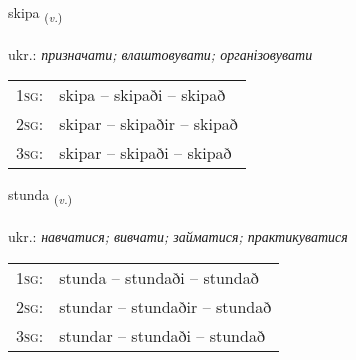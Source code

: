 \documentclass[frontgrid, backgrid]{flacards}\usepackage[]{graphicx}\usepackage[]{xcolor}
\begin{document}
\renewcommand{\flhead}{\vskip5pt \fboxsep=0pt {\small\bfseries\footnotesize Sagnorð | дієслово}}
\renewcommand{\fcfoot}{\vskip5pt \fboxsep=0pt \hspace{2pt}{\small\bfseries\footnotesize 1K}}

\renewcommand{\blhead}{\vskip5pt {\small\bfseries\footnotesize Sagnorð | дієслово }}
\renewcommand{\bcfoot}{\vskip5pt \hspace{2pt}{\small\bfseries\footnotesize 1K}}


{skipa \small{\textsubscript{(\textit{v.})}} \\[1ex] %
\textphonetic{[scɪːpa]} \\
ukr.: \emph{призначати; влаштовувати; організовувати} \\  [2ex]
\renewcommand*{\arraystretch}{0.8}
\begin{tabular}{p{1cm}l}
\textsc{1sg}: & skipa -- skipaði -- skipað \\ 
\textsc{2sg}: & skipar -- skipaðir -- skipað \\ 
\textsc{3sg}: & skipar -- skipaði -- skipað \\ 
\end{tabular}
}

\renewcommand{\flhead}{\vskip5pt \fboxsep=0pt {\small\bfseries\footnotesize Sagnorð | дієслово}}
\renewcommand{\fcfoot}{\vskip5pt \fboxsep=0pt \hspace{2pt}{\small\bfseries\footnotesize 1K}}

\renewcommand{\blhead}{\vskip5pt {\small\bfseries\footnotesize Sagnorð | дієслово }}
\renewcommand{\bcfoot}{\vskip5pt \hspace{2pt}{\small\bfseries\footnotesize 1K}}


{stunda \small{\textsubscript{(\textit{v.})}} \\[1ex] %
\textphonetic{[stʏnta]} \\
ukr.: \emph{навчатися; вивчати; займатися; практикуватися} \\  [2ex]
\renewcommand*{\arraystretch}{0.8}
\begin{tabular}{p{1cm}l}
\textsc{1sg}: & stunda -- stundaði -- stundað \\ 
\textsc{2sg}: & stundar -- stundaðir -- stundað \\ 
\textsc{3sg}: & stundar -- stundaði -- stundað \\ 
\end{tabular}
}
\end{document}
